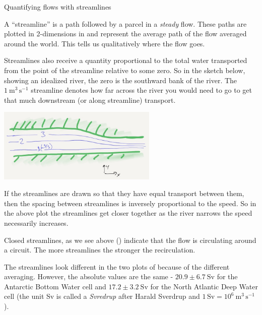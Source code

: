 \begin{derivbox}[label={box:Streamlines}]{Quantifying flows with streamlines}

A ``streamline'' is a path followed by a parcel in a \emph{steady} flow.  These paths are plotted in 2-dimensions in  and represent the average path of the flow averaged around the world.  This tells us qualitatively where the flow goes.

Streamlines also receive a quantity proportional to the total water transported from the point of the streamline relative to some zero.  So in the sketch below, showing an idealized river, the zero is the southward bank of the river.  The $1\ \mathrm{m^3\,s^{-1}}$ streamline denotes how far across the river you would need to go to get that much downstream (or along streamline) transport.  

\begin{center}
  \includegraphics[width=3in]{figs/WaterMasses/SketchStreamline}
    
\end{center}

If the streamlines are drawn so that they have equal transport between them, then the spacing between streamlines is inversely proportional to the speed.  So in the above plot the streamlines get closer together as the river narrows the speed necessarily increases. 

Closed streamlines, as we see above () indicate that the flow is circulating around a circuit.  The more streamlines the stronger the recirculation.  

\end{derivbox}

The streamlines look different in the two plots of  because of the different averaging.  However, the absolute values are the same - $20.9 \pm 6.7 \ \mathrm{Sv}$ for the Antarctic Bottom Water cell and $17.2\pm 3.2 \ \mathrm{Sv}$ for the North Atlantic Deep Water cell (the unit $\mathrm{Sv}$ is called a \emph{Svredrup} after Harald Sverdrup and $1\,\mathrm{Sv} = 10^{6}\ \mathrm{m^3\,s^{-1}}$).  

